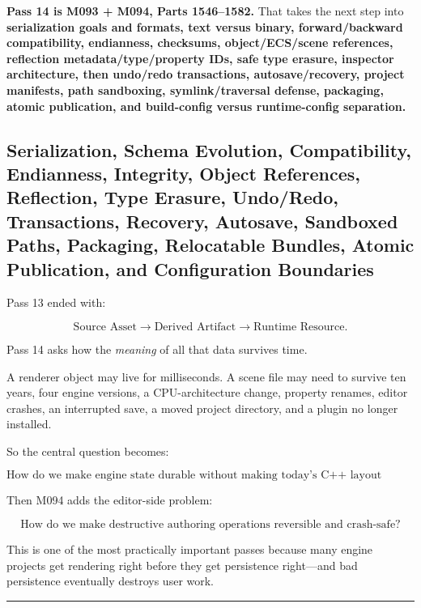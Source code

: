 \textbf{Pass 14 is M093 + M094, Parts 1546--1582.} That takes the next step into \textbf{serialization goals and formats, text versus binary, forward/backward compatibility, endianness, checksums, object/ECS/scene references, reflection metadata/type/property IDs, safe type erasure, inspector architecture, then undo/redo transactions, autosave/recovery, project manifests, path sandboxing, symlink/traversal defense, packaging, atomic publication, and build-config versus runtime-config separation.}

\subsection{Serialization, Schema Evolution, Compatibility, Endianness, Integrity, Object References, Reflection, Type Erasure, Undo/Redo, Transactions, Recovery, Autosave, Sandboxed Paths, Packaging, Relocatable Bundles, Atomic Publication, and Configuration Boundaries}\label{05-engine-i-ch011-serialization-schema-evolution-compatibility-endianness-integrity-object-references-reflection-type-erasure-undoredo-transactions-recovery-autosave-sandboxed-paths-packaging-relocatable-bundles-atomic-publication-and-configuration-boundaries}

Pass 13 ended with:

\[
\text{Source Asset}
\rightarrow
\text{Derived Artifact}
\rightarrow
\text{Runtime Resource}.
\]

Pass 14 asks how the \emph{meaning} of all that data survives time.

A renderer object may live for milliseconds. A scene file may need to survive ten years, four engine versions, a CPU-architecture change, property renames, editor crashes, an interrupted save, a moved project directory, and a plugin no longer installed.

So the central question becomes:

\[
\boxed{
\text{How do we make engine state durable without making today's C++ layout tomorrow's file format?}
}
\]

Then M094 adds the editor-side problem:

\[
\boxed{
\text{How do we make destructive authoring operations reversible and crash-safe?}
}
\]

This is one of the most practically important passes because many engine projects get rendering right before they get persistence right---and bad persistence eventually destroys user work.

\begin{center}\rule{0.5\linewidth}{0.5pt}\end{center}

